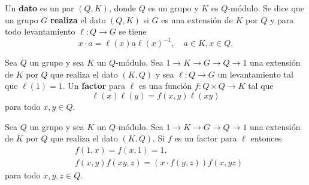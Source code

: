 \begin{definition}
	Un \textbf{dato} es un par $(Q,K)$, donde $Q$ es un grupo y $K$ es
	$Q$-módulo.  Se dice que un grupo $G$ \textbf{realiza} el dato $(Q,K)$ si
	$G$ es una extensión de $K$ por $Q$ y para todo levantamiento $\ell\colon
	Q\to G$ se tiene  
	\[
	x\cdot a=\ell(x)a\ell(x)^{-1},\quad a\in K,x\in Q.
	\]
\end{definition}

%

\begin{definition}
	Sea $Q$ un grupo y sea $K$ un $Q$-módulo. Sea $1\to K\to G\to Q\to 1$ una
	extensión de $K$ por $Q$ que realiza el dato $(K,Q)$ y sea $\ell\colon Q\to
	G$ un levantamiento tal que $\ell(1)=1$. Un \textbf{factor} para $\ell$ es
	una función $f\colon Q\times Q\to K$ tal que 
	\begin{equation}
		\label{eq:ell}
		\ell(x)\ell(y)=f(x,y)\ell(xy)
	\end{equation}
	para todo $x,y\in Q$. 
\end{definition}

\begin{lemma}
	Sea $Q$ un grupo y sea $K$ un $Q$-módulo. Sea $1\to K\to G\to Q\to 1$ una
	extensión de $K$ por $Q$ que realiza el dato $(K,Q)$. Si $f$ es un factor
	para $\ell$ entonces
	\begin{align}
		\label{eq:f(1x)}&f(1,x)=f(x,1)=1,\\
		\label{eq:fcocycle}&f(x,y)f(xy,z)=(x\cdot f(y,z))f(x,yz)
	\end{align}
	para todo $x,y,z\in Q$.
\end{lemma}

